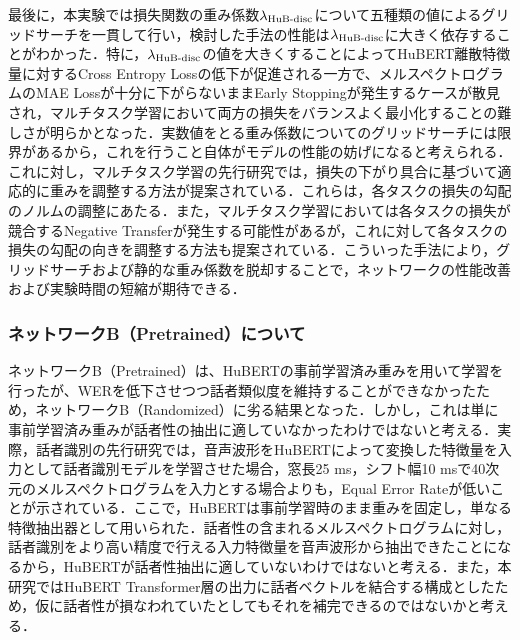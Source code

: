 最後に，本実験では損失関数の重み係数$\lambda_{\text{HuB-disc}}$について五種類の値によるグリッドサーチを一貫して行い，検討した手法の性能は$\lambda_{\text{HuB-disc}}$に大きく依存することがわかった．特に，$\lambda_{\text{HuB-disc}}$の値を大きくすることによってHuBERT離散特徴量に対するCross Entropy Lossの低下が促進される一方で、メルスペクトログラムのMAE Lossが十分に下がらないままEarly Stoppingが発生するケースが散見され，マルチタスク学習において両方の損失をバランスよく最小化することの難しさが明らかとなった．実数値をとる重み係数についてのグリッドサーチには限界があるから，これを行うこと自体がモデルの性能の妨げになると考えられる．これに対し，マルチタスク学習の先行研究では，損失の下がり具合に基づいて適応的に重みを調整する方法\cite{chen2018gradnorm,liu2019end}が提案されている．これらは，各タスクの損失の勾配のノルムの調整にあたる．また，マルチタスク学習においては各タスクの損失が競合するNegative Transfer\cite{crawshaw2020multi}が発生する可能性があるが，これに対して各タスクの損失の勾配の向きを調整する方法\cite{yu2020gradient}も提案されている．こういった手法により，グリッドサーチおよび静的な重み係数を脱却することで，ネットワークの性能改善および実験時間の短縮が期待できる．

\subsubsection{ネットワークB（Pretrained）について}
ネットワークB（Pretrained）は、HuBERTの事前学習済み重みを用いて学習を行ったが、WERを低下させつつ話者類似度を維持することができなかったため，ネットワークB（Randomized）に劣る結果となった．しかし，これは単に事前学習済み重みが話者性の抽出に適していなかったわけではないと考える．実際，話者識別の先行研究\cite{chen2022large}では，音声波形をHuBERTによって変換した特徴量を入力として話者識別モデルを学習させた場合，窓長25 ms，シフト幅10 msで40次元のメルスペクトログラムを入力とする場合よりも，Equal Error Rateが低いことが示されている．ここで，HuBERTは事前学習時のまま重みを固定し，単なる特徴抽出器として用いられた．話者性の含まれるメルスペクトログラムに対し，話者識別をより高い精度で行える入力特徴量を音声波形から抽出できたことになるから，HuBERTが話者性抽出に適していないわけではないと考える．また，本研究ではHuBERT Transformer層の出力に話者ベクトルを結合する構成としたため，仮に話者性が損なわれていたとしてもそれを補完できるのではないかと考える．

